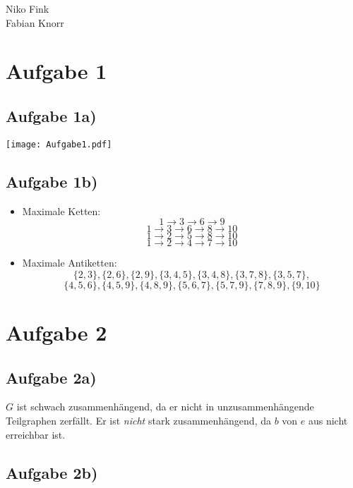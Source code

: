 \documentclass[a4paper,10pt]{article}
\begin{document}
\begin{flushright}
    Niko Fink\\
    Fabian Knorr
\end{flushright}
\vspace*{-5.5em}

\section*{Aufgabe 1}
\subsection*{Aufgabe 1a)}
\begin{center}
\texttt{[image: Aufgabe1.pdf]}
\end{center}

\subsection*{Aufgabe 1b)}

\begin{itemize}
\item Maximale Ketten:
\[1 \rightarrow 3 \rightarrow 6 \rightarrow 9\]
\[1 \rightarrow 3 \rightarrow 6 \rightarrow 8 \rightarrow 10\]
\[1 \rightarrow 2 \rightarrow 5 \rightarrow 8 \rightarrow 10\]
\[1 \rightarrow 2 \rightarrow 4 \rightarrow 7 \rightarrow 10\]

\item Maximale Antiketten:
\[\{2,3\}, \{2,6\}, \{2,9\}, \{3, 4,5\},\{3,4,8\},\{3,7,8\}, \{3, 5, 7\},\]
\[\{4, 5, 6\}, \{4,5,9\}, \{4,8,9\},
\{5,6,7\},\{5,7,9\}, \{7,8,9\}, \{9,10\}\]
\end{itemize}

\newpage
\section*{Aufgabe 2}

\subsection*{Aufgabe 2a)}

$G$ ist schwach zusammenhängend, da er nicht in unzusammenhängende Teilgraphen zerfällt. Er ist 
\textit{nicht} stark zusammenhängend, da $b$ von $e$ aus nicht erreichbar ist.

\subsection*{Aufgabe 2b)}
\end{document}
